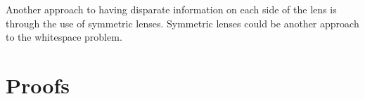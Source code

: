 \documentclass[numbers,10pt,preprint\ifanon ,nocopyrightspace\fi]{sigplanconf}
\begin{document}
Another approach to having disparate information on each side of the lens is
through the use of symmetric lenses.  Symmetric lenses could be another approach to the
whitespace problem.


\appendix

\ifanon\else
\acks 
\fi








\onecolumn
\section{Proofs}
\end{document}
